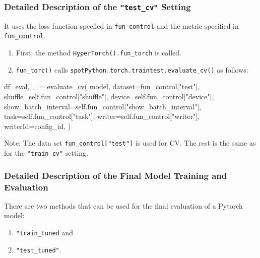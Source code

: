 \documentclass[
  letterpaper,
  DIV=11,
  numbers=noendperiod]{scrreprt}
\newenvironment{Shaded}{\begin{snugshade}}{\end{snugshade}}
\newcommand{\NormalTok}[1]{\textcolor[rgb]{0.00,0.23,0.31}{#1}}
\providecommand{\tightlist}{%
  \setlength{\itemsep}{0pt}\setlength{\parskip}{0pt}}\usepackage{longtable,booktabs,array}
\begin{document}
\hypertarget{detailed-description-of-the-test_cv-setting}{%
\subsubsection{\texorpdfstring{Detailed Description of the
\texttt{"test\_cv"}
Setting}{Detailed Description of the "test\_cv" Setting}}\label{detailed-description-of-the-test_cv-setting}}

It uses the loss function specfied in \texttt{fun\_control} and the
metric specified in \texttt{fun\_control}.

\begin{enumerate}
\def\labelenumi{\arabic{enumi}.}
\tightlist
\item
  First, the method \texttt{HyperTorch().fun\_torch} is called.
\item
  \texttt{fun\_torc()} calls
  \texttt{spotPython.torch.traintest.evaluate\_cv()} as follows:
\end{enumerate}

\begin{Shaded}
\begin{Highlighting}[]
\NormalTok{df\_eval, \_ = evaluate\_cv(}
\NormalTok{    model,}
\NormalTok{    dataset=fun\_control["test"],}
\NormalTok{    shuffle=self.fun\_control["shuffle"],}
\NormalTok{    device=self.fun\_control["device"],}
\NormalTok{    show\_batch\_interval=self.fun\_control["show\_batch\_interval"],}
\NormalTok{    task=self.fun\_control["task"],}
\NormalTok{    writer=self.fun\_control["writer"],}
\NormalTok{    writerId=config\_id,}
\NormalTok{)}
\end{Highlighting}
\end{Shaded}

Note: The data set \texttt{fun\_control{[}"test"{]}} is used for CV. The
rest is the same as for the \texttt{"train\_cv"} setting.

\hypertarget{sec-final-model-evaluation}{%
\subsubsection{Detailed Description of the Final Model Training and
Evaluation}\label{sec-final-model-evaluation}}

There are two methods that can be used for the final evaluation of a
Pytorch model:

\begin{enumerate}
\def\labelenumi{\arabic{enumi}.}
\tightlist
\item
  \texttt{"train\_tuned} and
\item
  \texttt{"test\_tuned"}.
\end{enumerate}
\end{document}
